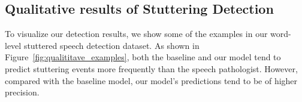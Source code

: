 \vspace{-14pt}
\subsection{Qualitative results of Stuttering Detection}
\vspace{-4pt}
To visualize our detection results, we show some of the examples in our word-level stuttered speech detection dataset.
As shown in Figure~\ref{fig:qualititave_examples}, both the baseline and our model tend to predict stuttering events more frequently than the speech pathologist.
However, compared with the baseline model, our model's predictions tend to be of higher precision.


